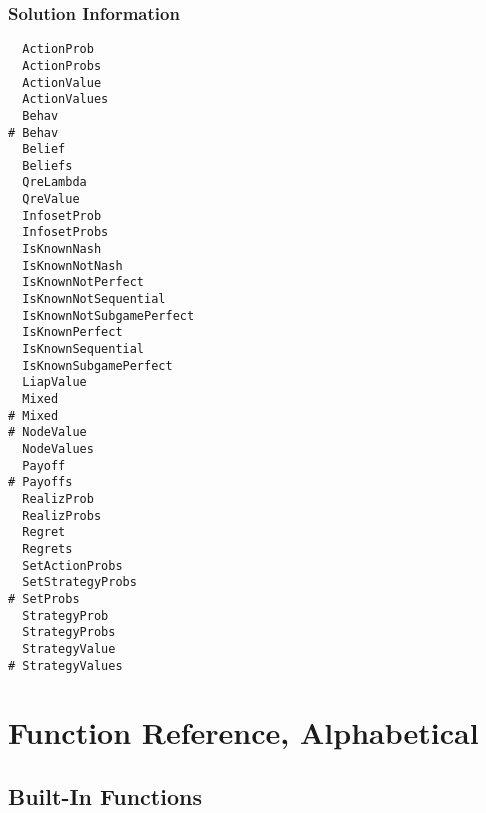 \subsection{Solution Information}

\begin{multicols}{3}
\begin{verbatim}
  ActionProb 
  ActionProbs 
  ActionValue 
  ActionValues 
  Behav 
# Behav 
  Belief 
  Beliefs 
  QreLambda 
  QreValue 
  InfosetProb 
  InfosetProbs 
  IsKnownNash 
  IsKnownNotNash 
  IsKnownNotPerfect 
  IsKnownNotSequential 
  IsKnownNotSubgamePerfect 
  IsKnownPerfect 
  IsKnownSequential 
  IsKnownSubgamePerfect 
  LiapValue 
  Mixed
# Mixed
# NodeValue 
  NodeValues 
  Payoff 
# Payoffs 
  RealizProb 
  RealizProbs 
  Regret
  Regrets
  SetActionProbs 
  SetStrategyProbs 
# SetProbs
  StrategyProb 
  StrategyProbs
  StrategyValue 
# StrategyValues 
\end{verbatim}
\end{multicols}

\chapter{Function Reference, Alphabetical}
\pagestyle{lexicon}

\section{Built-In Functions}

